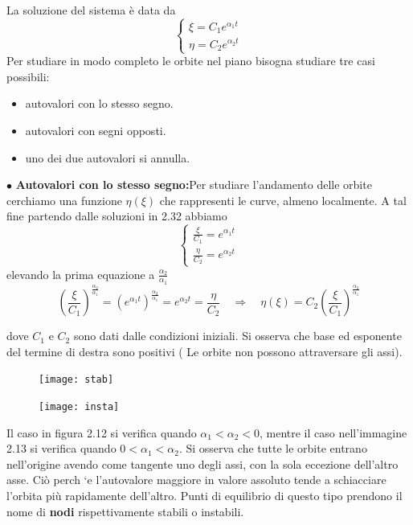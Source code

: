 La soluzione del sistema \`{e} data da 
\begin{equation}
		\left \{ \begin{array}{l}
		\xi = C_1 e^{\alpha_1 t}\\
		\eta = C_2 e^{\alpha_2 t}
	\end{array} \right.
\end{equation}
Per studiare in modo completo le orbite nel piano bisogna studiare tre casi possibili:
\begin{itemize}
	\item autovalori con lo stesso segno. 
	\item autovalori con segni opposti.
	\item uno dei due autovalori si annulla.
\end{itemize}
\newpage

$\bullet$ \textbf{Autovalori con lo stesso segno:}Per studiare l'andamento delle orbite cerchiamo una funzione $\eta(\xi)$ che rappresenti le curve, almeno localmente. A tal fine partendo dalle soluzioni in 2.32 abbiamo
\begin{equation*}
		\left \{ \begin{array}{l}
		\frac{\xi}{C_1} = e^{\alpha_1 t}\\
		\frac{\eta}{C_2} = e^{\alpha_2 t}
	\end{array} \right.
\end{equation*}
elevando la prima equazione a $\frac{\alpha_2}{\alpha_1}$
\begin{equation}
	\left (\frac{\xi}{C_1}\right)^{\frac{\alpha_2}{\alpha_1}}= \left (e^{\alpha_1 t} \right )^{\frac{\alpha_2}{\alpha_1}} = e^{\alpha_2t} = \frac{\eta}{C_2} \quad \Rightarrow \quad \boxed{ \eta(\xi) = C_2\left (\frac{\xi}{C_1}\right)^{\frac{\alpha_2}{\alpha_1}}}
\end{equation}

dove $C_1$ e $C_2$ sono dati dalle condizioni iniziali. Si osserva che base ed esponente del termine di destra sono positivi ( Le orbite non possono attraversare gli assi).
\vspace{0.2in}
\begin{figure}[!ht]
\centering
\begin{minipage}{.5\textwidth}
  \centering
  \texttt{[image: stab]}
  \end{minipage}%
\begin{minipage}{.5\textwidth}
  \centering
  \texttt{[image: insta]}
\end{minipage}
\end{figure}
Il caso in figura 2.12 si verifica quando $\alpha_1 < \alpha_2 < 0$, mentre il caso nell'immagine 2.13 si verifica quando $0< \alpha_1 < \alpha_2$. Si osserva che tutte le orbite entrano nell’origine avendo come tangente uno degli assi, con la sola eccezione dell’altro asse. Ci\`{o} perch `{e} l'autovalore maggiore in valore assoluto tende a schiacciare l'orbita pi\`{u} rapidamente dell'altro. Punti di equilibrio di questo tipo prendono il nome di \textbf{nodi} rispettivamente stabili o instabili.
\newpage

